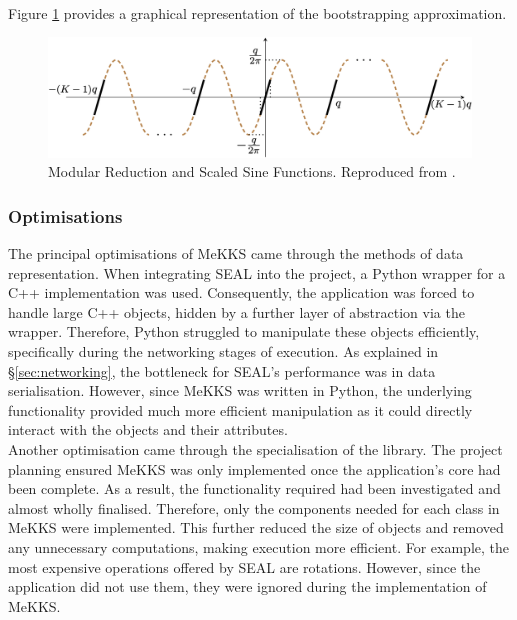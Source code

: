 \smallskip \\ \indent
Figure \ref{fig:bootstrapping} provides a graphical representation of the bootstrapping approximation.
\begin{figure}[ht]
    \centering
    \includegraphics[scale=0.3]{figures/bootstrapping.png}
    \caption[Bootstrapping Procedure]{Modular Reduction and Scaled Sine Functions. Reproduced from \cite{BootstrappingHEAAN}.}
    \label{fig:bootstrapping}
\end{figure}

\setlength{\leftskip}{0cm}
\subsubsection{Optimisations}
\setlength{\leftskip}{0.5cm}
\indent \indent
The principal optimisations of MeKKS came through the methods of data representation. When integrating SEAL into the project, a Python wrapper for a C++ implementation was used. Consequently, the application was forced to handle large C++ objects, hidden by a further layer of abstraction via the wrapper. Therefore, Python struggled to manipulate these objects efficiently, specifically during the networking stages of execution. As explained in §\ref{sec:networking}, the bottleneck for SEAL's performance was in data serialisation. However, since MeKKS was written in Python, the underlying functionality provided much more efficient manipulation as it could directly interact with the objects and their attributes.
\smallskip \\ \indent
Another optimisation came through the specialisation of the library. The project planning ensured MeKKS was only implemented once the application's core had been complete. As a result, the functionality required had been investigated and almost wholly finalised. Therefore, only the components needed for each class in MeKKS were implemented. This further reduced the size of objects and removed any unnecessary computations, making execution more efficient. For example, the most expensive operations offered by SEAL are rotations. However, since the application did not use them, they were ignored during the implementation of MeKKS.

